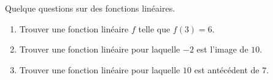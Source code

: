 
\begin{exercice}\label{exosmath-0502}

    Quelque questions sur des fonctions linéaires.
    \begin{enumerate}
        \item
            Trouver une fonction linéaire \( f\) telle que \( f(3)=6\).
        \item
            Trouver une fonction linéaire pour laquelle \( -2\) est l'image de \( 10\).
        \item
            Trouver une fonction linéaire pour laquelle \( 10\) est antécédent de \( 7\).
    \end{enumerate}

\end{exercice}
